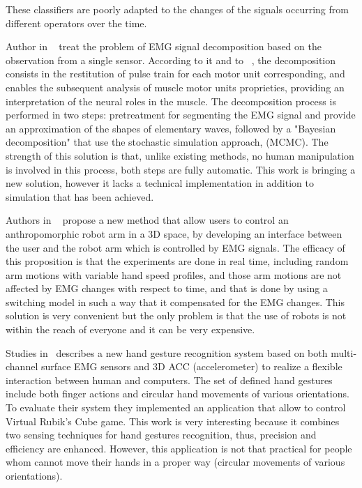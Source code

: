 \documentclass[conference]{IEEEtran}
\begin{document}
These classifiers are poorly adapted to the changes of the signals occurring from different operators over the time.\par


Author in ~\cite{LeCarpentier} treat the problem of EMG signal decomposition based on the observation from a single sensor. According to it and to ~\cite{DeLuca}, the decomposition consists in the restitution of pulse train for each motor unit corresponding, and enables the subsequent analysis of muscle motor units proprieties, providing an interpretation of the neural roles in the muscle. The decomposition process is performed in two steps: pretreatment for segmenting the EMG signal and provide an approximation of the shapes of elementary waves, followed by a "Bayesian decomposition" that use the stochastic simulation approach, (MCMC).
The strength of this solution is that, unlike existing methods, no human manipulation is involved in this process, both steps are fully automatic. This work is bringing a new solution, however it lacks a technical implementation in addition to simulation that has been achieved.\par%
Authors in ~\cite{Artemiadis} propose a new method that allow users to control an anthropomorphic robot arm in a 3D space, by developing an interface between the user and the robot arm which is controlled by EMG signals. The efficacy of this proposition is that the experiments are done in real time, including random arm motions with variable hand speed profiles, and those arm motions are not affected by EMG changes with respect to time, and that is done by using a switching model in such a way that it compensated for the EMG changes. This solution is very convenient but the only problem is that the use of robots is not within the reach of everyone and it can be very expensive.\par
Studies in~\cite{Zhang} describes a new hand gesture recognition system based on both multi-channel surface EMG sensors and 3D ACC (accelerometer) to realize a flexible interaction between human and computers. The set of defined hand gestures include both finger actions and circular hand movements of various orientations. To evaluate their system they implemented an application that allow to control Virtual Rubik's Cube game. This work is very interesting because it combines two sensing techniques for hand gestures recognition, thus, precision and efficiency are enhanced. However, this application is not that practical for people whom cannot move their hands in a proper way (circular movements of various orientations).\par
\end{document}
